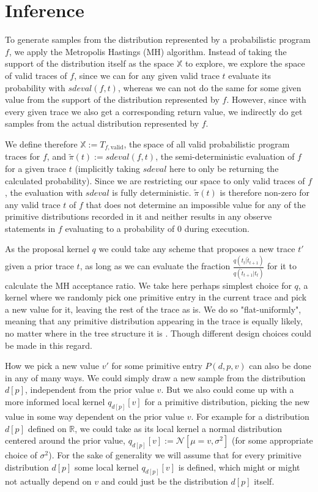 \section{Inference}

To generate samples from the distribution represented by a probabilistic program $f$, we apply the Metropolis Hastings (MH) algorithm. Instead of taking the support of the distribution itself as the space $\mathbb{X}$ to explore, we explore the space of valid traces of $f$, since we can for any given valid trace $t$ evaluate its probability with $sdeval(f,t)$, whereas we can not do the same for some given value from the support of the distribution represented by $f$. However, since with every given trace we also get a corresponding return value, we indirectly do get samples from the actual distribution represented by $f$.

We define therefore $\mathbb{X} := T_{f,\text{valid}}$, the space of all valid probabilistic program traces for $f$, and $\tilde{\pi}(t) := sdeval(f,t)$, the semi-deterministic evaluation of $f$ for a given trace $t$ (implicitly taking $sdeval$ here to only be returning the calculated probability). Since we are restricting our space to only valid traces of $f$, the evaluation with $sdeval$ is fully deterministic. $\tilde{\pi}(t)$ is therefore non-zero for any valid trace $t$ of $f$ that does not determine an impossible value for any of the primitive distributions recorded in it and neither results in any observe statements in $f$ evaluating to a probability of $0$ during execution.

As the proposal kernel $q$ we could take any scheme that proposes a new trace $t'$ given a prior trace $t$, as long as we can evaluate the fraction $\frac{q(t_t | \hat{t}_{t+1})}{q(\hat{t}_{t+1} | t_t)}$ for it to calculate the MH acceptance ratio. We take here perhaps simplest choice for $q$, a kernel where we randomly pick one primitive entry in the current trace and pick a new value for it, leaving the rest of the trace as is. We do so "flat-uniformly", meaning that any primitive distribution appearing in the trace is equally likely, no matter where in the tree structure it is \cite{wingate2011lightweight}. Though different design choices could be made in this regard.

How we pick a new value $v'$ for some primitive entry $P(d,p,v)$ can also be done in any of many ways. We could simply draw a new sample from the distribution $d[p]$, independent from the prior value $v$. But we also could come up with a more informed local kernel $q_{d[p]}[v]$ for a primitive distribution, picking the new value in some way dependent on the prior value $v$. For example for a distribution $d[p]$ defined on $\mathbb{R}$, we could take as its local kernel a normal distribution centered around the prior value, $q_{d[p]}[v] := \mathcal{N}[\mu = v, \sigma^2]$ (for some appropriate choice of $\sigma^2$). For the sake of generality we will assume that for every primitive distribution $d[p]$ some local kernel $q_{d[p]}[v]$ is defined, which might or might not actually depend on $v$ and could just be the distribution $d[p]$ itself.

